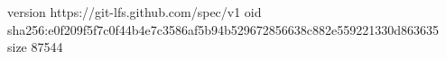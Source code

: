 version https://git-lfs.github.com/spec/v1
oid sha256:e0f209f5f7c0f44b4e7c3586af5b94b529672856638c882e559221330d863635
size 87544
